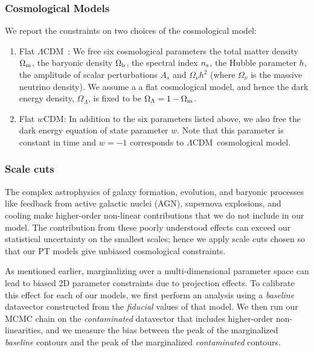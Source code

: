 \documentclass[aps, prd,twocolumn,superscriptaddress,nofootinbib,preprintnumbers]{revtex4-1}
\newcommand{\lcdm}{$\Lambda$CDM}
\newcommand{\wcdm}{$w$CDM}
\begin{document}
\subsubsection{Cosmological Models}
\label{sec:cosmo_models}
We report the constraints on two choices of the cosmological model:
\begin{enumerate}
    \item Flat \lcdm\ : We free six cosmological parameters the total matter density $\Omega_{\rm m}$, the baryonic density $\Omega_{\rm b}$,  the spectral index $n_{\rm s}$, the Hubble parameter $h$, the amplitude of scalar perturbations $A_s$ and $\Omega_\nu h^2$ (where $\Omega_\nu$ is the massive neutrino density). We assume a a flat cosmological model, and hence the dark energy density, $\Omega_\Lambda$, is fixed to be $\Omega_\Lambda = 1 - \Omega_{\rm m}$.
    \item Flat \wcdm : In addition to the six parameters listed above, we also free the dark energy equation of state parameter $w$. Note that this parameter is constant in time and $w=-1$ corresponds to \lcdm\ cosmological model. 
\end{enumerate}


\subsubsection{Scale cuts}\label{sec:scale_cuts}

The complex astrophysics of galaxy formation, evolution, and baryonic processes like feedback from active galactic nuclei (AGN), supernova explosions, and cooling make higher-order non-linear contributions that we do not include in our model. The contribution from these poorly understood effects can exceed our statistical uncertainty on the smallest scales; hence we apply scale cuts chosen so that our PT models give unbiased cosmological constraints.%

As mentioned earlier, marginalizing over a multi-dimensional parameter space can lead to biased 2D parameter constraints due to projection effects. To calibrate this effect for each of our models, we first perform an analysis using a \textit{baseline} datavector constructed from the \textit{fiducial} values of that model. 
We then run our MCMC chain on the \textit{contaminated} datavector that includes higher-order non-linearities, and we measure the bias between the peak of the marginalized \textit{baseline} contours and the peak of the marginalized \textit{contaminated} contours. 
\end{document}
